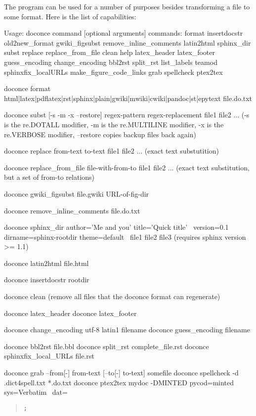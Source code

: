 \documentclass{book}
\begin{document}
{The  program can be used for a number of purposes besides
transforming a  file to some format. Here is the
list of capabilities:

\bshpro
Usage: doconce command [optional arguments]
commands: format insertdocstr old2new_format gwiki_figsubst remove_inline_comments latin2html sphinx_dir subst replace replace_from_file clean help latex_header latex_footer guess_encoding change_encoding bbl2rst split_rst list_labels teamod sphinxfix_localURLs make_figure_code_links grab spellcheck ptex2tex

doconce format html|latex|pdflatex|rst|sphinx|plain|gwiki|mwiki|cwiki|pandoc|st|epytext file.do.txt

doconce subst [-s -m -x --restore] regex-pattern regex-replacement file1 file2 ...
(-s is the re.DOTALL modifier, -m is the re.MULTILINE modifier,
 -x is the re.VERBOSE modifier, --restore copies backup files back again)

doconce replace from-text to-text file1 file2 ...
(exact text substutition)

doconce replace_from_file file-with-from-to file1 file2 ...
(exact text substitution, but a set of from-to relations)

doconce gwiki_figsubst file.gwiki URL-of-fig-dir

doconce remove_inline_comments file.do.txt

doconce sphinx_dir author='Me and you' title='Quick title' \
    version=0.1 dirname=sphinx-rootdir theme=default \
    file1 file2 file3
(requires sphinx version >= 1.1)

doconce latin2html file.html

doconce insertdocstr rootdir

doconce clean
(remove all files that the doconce format can regenerate)

doconce latex_header
doconce latex_footer

doconce change_encoding utf-8 latin1 filename
doconce guess_encoding filename

doconce bbl2rst file.bbl
doconce split_rst complete_file.rst
doconce sphinxfix_local_URLs file.rst

doconce grab --from[-] from-text [--to[-] to-text] somefile
doconce spellcheck -d .dict4spell.txt *.do.txt
doconce ptex2tex mydoc -DMINTED pycod=minted sys=Verbatim \
        dat=\begin{quote}\begin{verbatim};\end{verbatim}\end{quote}

}
\end{document}
